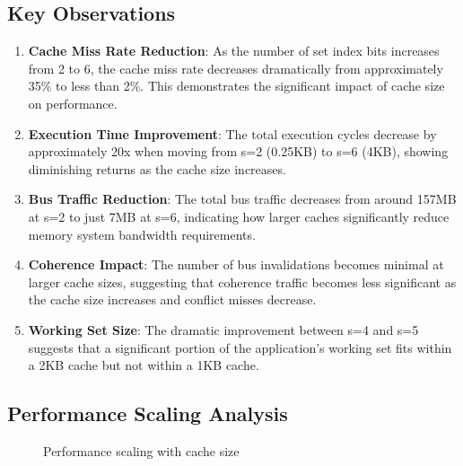 \documentclass[12pt,a4paper]{article}
\begin{document}
\subsection{Key Observations}

\begin{enumerate}
    \item \textbf{Cache Miss Rate Reduction}: As the number of set index bits increases from 2 to 6, the cache miss rate decreases dramatically from approximately 35\% to less than 2\%. This demonstrates the significant impact of cache size on performance.
    
    \item \textbf{Execution Time Improvement}: The total execution cycles decrease by approximately 20x when moving from s=2 (0.25KB) to s=6 (4KB), showing diminishing returns as the cache size increases.
    
    \item \textbf{Bus Traffic Reduction}: The total bus traffic decreases from around 157MB at s=2 to just 7MB at s=6, indicating how larger caches significantly reduce memory system bandwidth requirements.
    
    \item \textbf{Coherence Impact}: The number of bus invalidations becomes minimal at larger cache sizes, suggesting that coherence traffic becomes less significant as the cache size increases and conflict misses decrease.
    
    \item \textbf{Working Set Size}: The dramatic improvement between s=4 and s=5 suggests that a significant portion of the application's working set fits within a 2KB cache but not within a 1KB cache.
\end{enumerate}

\subsection{Performance Scaling Analysis}

\begin{figure}[H]
\centering
{}
\caption{Performance scaling with cache size}
\label{fig:performance_scaling}
\end{figure}
\end{document}
